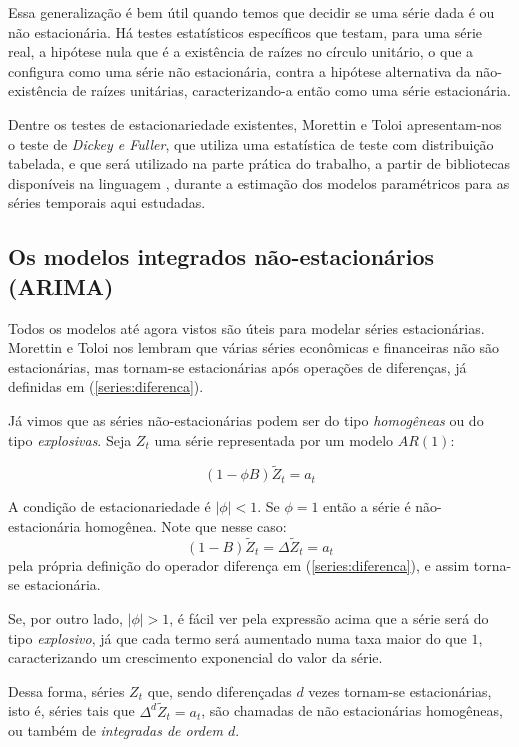 Essa generalização é bem útil quando temos que decidir se uma série dada é ou não estacionária. Há testes estatísticos específicos que testam, para uma série real, a hipótese nula que é a existência de raízes no círculo unitário, o que a configura como uma série não estacionária, contra a hipótese alternativa da não-existência de raízes unitárias, caracterizando-a então como uma série estacionária.

Dentre os testes de estacionariedade existentes, Morettin e Toloi \citep{morettin} apresentam-nos o teste de \emph{Dickey e Fuller}, que utiliza uma estatística de teste com distribuição tabelada, e que será utilizado na parte prática do trabalho, a partir de bibliotecas disponíveis na linguagem , durante a estimação dos modelos paramétricos para as séries temporais aqui estudadas.


\subsection{Os modelos integrados não-estacionários (ARIMA)}

Todos os modelos até agora vistos são úteis para modelar séries estacionárias. Morettin e Toloi \citep{morettin} nos lembram que várias séries econômicas e financeiras não são estacionárias, mas tornam-se estacionárias após operações de diferenças, já definidas em (\ref{series:diferenca}). 

Já vimos que as séries não-estacionárias podem ser do tipo \emph{homogêneas} ou do tipo \emph{explosivas}. Seja $Z_t$ uma série representada por um modelo $AR(1)$:

\[
(1 - \phi B)\tilde{Z}_t = a_t
\]

A condição de estacionariedade é $|\phi| < 1$. Se $\phi = 1$ então a série é não-estacionária homogênea. Note que nesse caso: 
\[ (1 - B)\tilde{Z}_t = \Delta \tilde{Z}_t = a_t \]
pela própria definição do operador diferença em (\ref{series:diferenca}), e assim torna-se estacionária. 

Se, por outro lado, $|\phi| > 1$, é fácil ver pela expressão acima que a série será do tipo \emph{explosivo}, já que cada termo será aumentado numa taxa maior do que $1$, caracterizando um crescimento exponencial do valor da série.

Dessa forma, séries $Z_t$ que, sendo diferençadas $d$ vezes tornam-se estacionárias, isto é, séries tais que $\Delta^d \tilde{Z}_t = a_t$, são chamadas de não estacionárias homogêneas, ou também de \emph{integradas de ordem $d$}.

